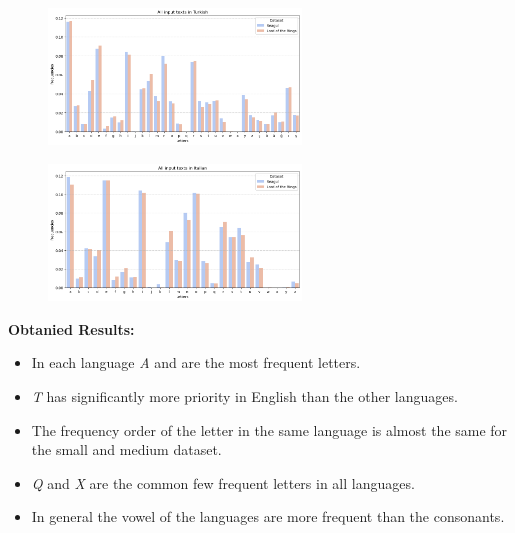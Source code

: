\begin{figure}[h]
    \centering
    \includegraphics[width=0.6\textwidth]{media/allTurkish.png}
\end{figure}

\begin{figure}[h]
    \centering
    \includegraphics[width=0.6\textwidth]{media/allItalian.png}
\end{figure}


\textbf{Obtanied Results:}
\begin{itemize}
    \item In each language \textit{A} and  are the most frequent letters.
    \item \textit{T} has significantly more priority in English than the other languages.
    \item The frequency order of the letter in the same language is almost the same for the small and medium dataset.
    \item \textit{Q} and \textit{X} are the common few frequent letters in all languages.
    \item In general the vowel of the languages are more frequent than the consonants.
\end{itemize}
